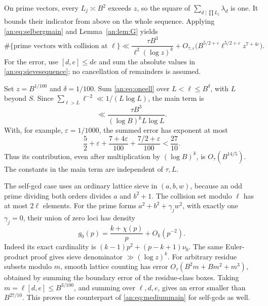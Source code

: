 \documentclass[11pt,reqno]{amsart}
\theoremstyle{definition}
\numberwithin{equation}{section}
\begin{document}
On prime vectors, every $L_j\asymp B^2$ exceeds $z$, so the square of $\sum_{d\mid\prod L_j}\lambda_d$ is one. It bounds their indicator from above on the whole sequence. Applying \eqref{an:eq:selbergmain} and Lemma~\ref{an:lem:G} yields
\begin{equation}\label{an:eq:oneell}
 \#\{\text{prime vectors with collision at }\ell\}
 \ll \frac{\tau B^3}{\ell^2(\log z)^k}
 +O_{\tau,\varepsilon}\bigl(B^{5/2+\varepsilon}\ell^{5/2+\varepsilon}z^{7+4\varepsilon}\bigr).
\end{equation}
For the error, use $[d,e]\le de$ and sum the absolute values in \eqref{an:eq:sievesequence}; no cancellation of remainders is assumed.

Set $z=B^{1/100}$ and $\delta=1/100$. Sum \eqref{an:eq:oneell} over $L<\ell\le B^\delta$, with $L$ beyond $S$. Since $\sum_{\ell>L}\ell^{-2}\ll1/(L\log L)$, the main term is
\begin{equation}\label{an:eq:mediummain}
 \ll\frac{\tau B^3}{(\log B)^kL\log L}.
\end{equation}
With, for example, $\varepsilon=1/1000$, the summed error has exponent at most
\[
 \frac52+\varepsilon+\frac{7+4\varepsilon}{100}
       +\frac{7/2+\varepsilon}{100}<\frac{27}{10}.
\]
Thus its contribution, even after multiplication by $(\log B)^k$, is $O_\tau(B^{14/5})$. The constants in the main term are independent of $\tau,L$.

The self-gcd case uses an ordinary lattice sieve in $(a,b,w)$, because an odd prime dividing both orders divides $a$ and $b^2+1$. The collision set modulo $\ell$ has at most $2\ell$ elements. For the prime forms $a^2+b^2+\gamma_jw^2$, with exactly one $\gamma_j=0$, their union of zero loci has density
\[
 g_0(p)=\frac{k+\chi(p)}p+O_k(p^{-2}).
\]
Indeed its exact cardinality is $(k-1)p^2+(p-k+1)\nu_0$. The same Euler-product proof gives sieve denominator $\gg(\log z)^k$. For arbitrary residue subsets modulo $m$, smooth lattice counting has error $O_\tau(B^2m+Bm^2+m^3)$, obtained by summing the boundary error of the residue-class boxes. Taking $m=\ell[d,e]\le B^{3/100}$, and summing over $\ell,d,e$, gives an error smaller than $B^{27/10}$. This proves the counterpart of \eqref{an:eq:mediummain} for self-gcds as well.
\end{document}
